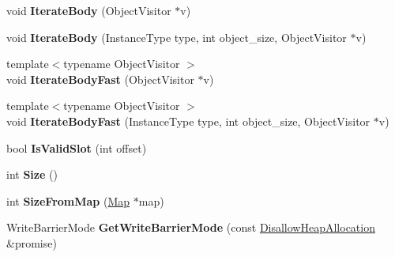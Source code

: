\begin{DoxyCompactItemize}
\item 
void {\bfseries Iterate\+Body} (Object\+Visitor $\ast$v)\hypertarget{classv8_1_1internal_1_1_heap_object_a8f9d59c629271dd0dc2d54b9bf412f37}{}\label{classv8_1_1internal_1_1_heap_object_a8f9d59c629271dd0dc2d54b9bf412f37}

\item 
void {\bfseries Iterate\+Body} (Instance\+Type type, int object\+\_\+size, Object\+Visitor $\ast$v)\hypertarget{classv8_1_1internal_1_1_heap_object_a3e14da87e4be1ebc47aa8f2ee77ea1a4}{}\label{classv8_1_1internal_1_1_heap_object_a3e14da87e4be1ebc47aa8f2ee77ea1a4}

\item 
{\footnotesize template$<$typename Object\+Visitor $>$ }\\void {\bfseries Iterate\+Body\+Fast} (Object\+Visitor $\ast$v)\hypertarget{classv8_1_1internal_1_1_heap_object_a201dcc8e6951989d9766d21af1c6ce20}{}\label{classv8_1_1internal_1_1_heap_object_a201dcc8e6951989d9766d21af1c6ce20}

\item 
{\footnotesize template$<$typename Object\+Visitor $>$ }\\void {\bfseries Iterate\+Body\+Fast} (Instance\+Type type, int object\+\_\+size, Object\+Visitor $\ast$v)\hypertarget{classv8_1_1internal_1_1_heap_object_ac1700306274f050d29df8eea0662d963}{}\label{classv8_1_1internal_1_1_heap_object_ac1700306274f050d29df8eea0662d963}

\item 
bool {\bfseries Is\+Valid\+Slot} (int offset)\hypertarget{classv8_1_1internal_1_1_heap_object_a2d6f2a9a46d8d2254fa56739d2209796}{}\label{classv8_1_1internal_1_1_heap_object_a2d6f2a9a46d8d2254fa56739d2209796}

\item 
int {\bfseries Size} ()\hypertarget{classv8_1_1internal_1_1_heap_object_a53f4a8784ede9710d87dec27abb0a91d}{}\label{classv8_1_1internal_1_1_heap_object_a53f4a8784ede9710d87dec27abb0a91d}

\item 
int {\bfseries Size\+From\+Map} (\hyperlink{classv8_1_1internal_1_1_map}{Map} $\ast$map)\hypertarget{classv8_1_1internal_1_1_heap_object_af343e340194a7e19c9c7ff91bed7bf95}{}\label{classv8_1_1internal_1_1_heap_object_af343e340194a7e19c9c7ff91bed7bf95}

\item 
Write\+Barrier\+Mode {\bfseries Get\+Write\+Barrier\+Mode} (const \hyperlink{classv8_1_1internal_1_1_per_thread_assert_scope_debug_only}{Disallow\+Heap\+Allocation} \&promise)\hypertarget{classv8_1_1internal_1_1_heap_object_acfba4c3365f4b6c70caa7c0ec14e4244}{}\label{classv8_1_1internal_1_1_heap_object_acfba4c3365f4b6c70caa7c0ec14e4244}


\end{DoxyCompactItemize}
